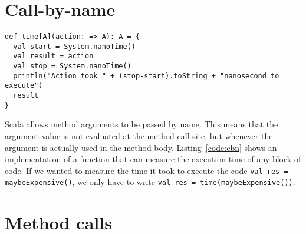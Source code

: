 \section{Call-by-name}

\begin{lstlisting}[caption=Call-by-name, label=code:cbn, escapechar=|, float, floatplacement=H]
def time[A](action: => A): A = {
  val start = System.nanoTime()
  val result = action
  val stop = System.nanoTime()
  println("Action took " + (stop-start).toString + "nanosecond to execute")
  result
}
\end{lstlisting}

Scala allows method arguments to be passed by name.
This means that the argument value is not evaluated at the method call-site, but whenever the argument is actually used in the method body.
Listing~\ref{code:cbn} shows an implementation of a function that can measure the execution time of any block of code.
If we wanted to measure the time it took to execute the code \texttt{val res = maybeExpensive()}, we only have to write \texttt{val res = time(maybeExpensive())}.

\section{Method calls}
